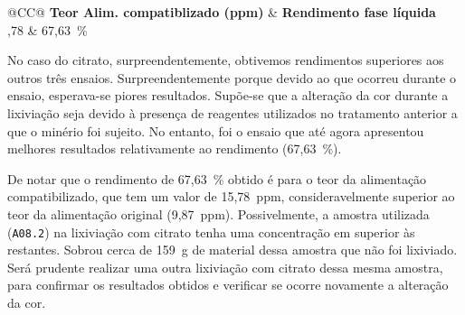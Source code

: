 \begin{table}[!ht]
    \centering
    \begin{tabularx}{\textwidth}{@{}CC@{}}
        \toprule
        \textbf{Teor Alim. compatiblizado (ppm)} & \textbf{Rendimento fase líquida} \\ ,78 & 67,63~\% \\ \bottomrule                  
    \end{tabularx}
    \caption{Teor da alimentação compatibilizado (Citrato).}
    \label{tab:compatibalized-grade-feed-citrato}
\end{table}

No caso do citrato, surpreendentemente, obtivemos rendimentos superiores aos outros três ensaios.
Surpreendentemente porque devido ao que ocorreu durante o ensaio, esperava-se piores resultados.
Supõe-se que a alteração da cor durante a lixiviação seja devido à presença de reagentes utilizados no tratamento anterior a que o minério foi sujeito.
No entanto, foi o ensaio que até agora apresentou melhores resultados relativamente ao rendimento (67,63~\%).

De notar que o rendimento de 67,63~\% obtido é para o teor da alimentação compatibilizado, que tem um valor de 15,78~ppm, consideravelmente superior ao teor da alimentação original (9,87~ppm).
Possivelmente, a amostra utilizada (\texttt{A08.2}) na lixiviação com citrato tenha uma concentração em  superior às restantes. 
Sobrou cerca de 159~g de material dessa amostra que não foi lixiviado.
Será prudente realizar uma outra lixiviação com citrato dessa mesma amostra, para confirmar os resultados obtidos e verificar se ocorre novamente a alteração da cor.